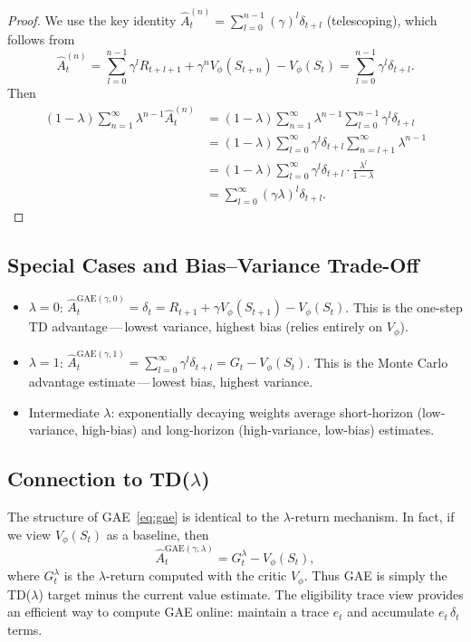\begin{proof}
We use the key identity $\hat A_t^{(n)} = \sum_{l=0}^{n-1}(\gamma)^l\delta_{t+l}$ (telescoping), which follows from
\[
\hat A_t^{(n)} = \sum_{l=0}^{n-1}\gamma^l R_{t+l+1} + \gamma^n V_\phi(S_{t+n}) - V_\phi(S_t)
= \sum_{l=0}^{n-1}\gamma^l\delta_{t+l}.
\]
Then
\begin{align*}
(1-\lambda)\sum_{n=1}^{\infty}\lambda^{n-1}\hat A_t^{(n)}
&= (1-\lambda)\sum_{n=1}^{\infty}\lambda^{n-1}\sum_{l=0}^{n-1}\gamma^l\delta_{t+l}\\
&= (1-\lambda)\sum_{l=0}^{\infty}\gamma^l\delta_{t+l}\sum_{n=l+1}^{\infty}\lambda^{n-1}\\
&= (1-\lambda)\sum_{l=0}^{\infty}\gamma^l\delta_{t+l}\cdot\frac{\lambda^l}{1-\lambda}\\
&= \sum_{l=0}^{\infty}(\gamma\lambda)^l\delta_{t+l}.
\end{align*}
\end{proof}

\subsection{Special Cases and Bias--Variance Trade-Off}

\begin{itemize}[leftmargin=*]
  \item $\lambda = 0$: $\hat A_t^{\mathrm{GAE}(\gamma,0)} = \delta_t = R_{t+1}+\gamma V_\phi(S_{t+1})-V_\phi(S_t)$.  This is the one-step TD advantage\,---\,lowest variance, highest bias (relies entirely on $V_\phi$).
  \item $\lambda = 1$: $\hat A_t^{\mathrm{GAE}(\gamma,1)} = \sum_{l=0}^{\infty}\gamma^l\delta_{t+l} = G_t - V_\phi(S_t)$.  This is the Monte Carlo advantage estimate\,---\,lowest bias, highest variance.
  \item Intermediate $\lambda$: exponentially decaying weights average short-horizon (low-variance, high-bias) and long-horizon (high-variance, low-bias) estimates.
\end{itemize}

\subsection{Connection to TD($\lambda$)}

The structure of GAE~\eqref{eq:gae} is identical to the $\lambda$-return mechanism.  In fact, if we view $V_\phi(S_t)$ as a baseline, then
\[
\hat A_t^{\mathrm{GAE}(\gamma,\lambda)} = G_t^\lambda - V_\phi(S_t),
\]
where $G_t^\lambda$ is the $\lambda$-return computed with the critic $V_\phi$.  Thus GAE is simply the TD($\lambda$) target minus the current value estimate.  The eligibility trace view provides an efficient way to compute GAE online: maintain a trace $e_t$ and accumulate $e_t\,\delta_t$ terms.

